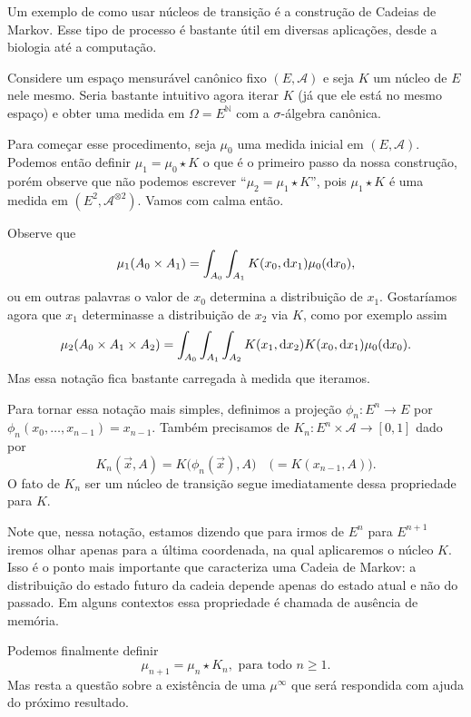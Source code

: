 Um exemplo de como usar núcleos de transição é a construção de Cadeias de Markov.
Esse tipo de processo é bastante útil em diversas aplicações, desde a biologia até a computação.

Considere um espaço mensurável canônico fixo $(E, \mathcal{A})$ e seja $K$ um núcleo de $E$ nele mesmo.
Seria bastante intuitivo agora iterar $K$ (já que ele está no mesmo espaço)
e obter uma medida em $\Omega =E^{\mathbb{N}}$ com a $\sigma$-álgebra canônica.

Para começar esse procedimento, seja $\mu_0$ uma medida inicial em $(E, \mathcal{A})$.
Podemos então definir $\mu_1 = \mu_0 \star K$ o que é o primeiro passo da nossa construção, porém observe que não podemos escrever ``$\mu_2 = \mu_1 \star K$'', pois $\mu_1 \star K$ é uma medida em $(E^2, \mathcal{A}^{\otimes 2})$.
Vamos com calma então.

Observe que
\begin{equation}
  \mu_1(A_0 \times A_1) = \int_{A_0} \int_{A_1} K(x_0, \mathop{}\!\mathrm{d} x_1) \mu_0(\mathop{}\!\mathrm{d} x_0),
\end{equation}
ou em outras palavras o valor de $x_0$ determina a distribuição de $x_1$.
Gostaríamos agora que $x_1$ determinasse a distribuição de $x_2$ via $K$, como por exemplo assim
\begin{equation}
  \mu_2(A_0 \times A_1 \times A_2) = \int_{A_0} \int_{A_1} \int_{A_2} K(x_1, \mathop{}\!\mathrm{d} x_2) K(x_0, \mathop{}\!\mathrm{d} x_1) \mu_0 (\mathop{}\!\mathrm{d} x_0).
\end{equation}
Mas essa notação fica bastante carregada à medida que iteramos.

Para tornar essa notação mais simples, definimos a projeção $\phi_n:E^n \to E$ por $\phi_n(x_0, \dots, x_{n-1}) = x_{n-1}$.
Também precisamos de $K_n: E^n \times \mathcal{A} \to [0,1]$ dado por
\begin{equation}
  K_n(\vec{x},A) = K\big(\phi_n(\vec{x}), A\big) \quad \big(= K(x_{n-1},A) \big).
\end{equation}
O fato de $K_n$ ser um núcleo de transição segue imediatamente dessa propriedade para $K$.

Note que, nessa notação, estamos dizendo que para irmos de $E^n$ para $E^{n+1}$ iremos olhar apenas para a última coordenada, na qual aplicaremos o núcleo $K$.
Isso é o ponto mais importante que caracteriza uma Cadeia de Markov: a distribuição do estado futuro da cadeia depende apenas do estado atual e não do passado.
Em alguns contextos essa propriedade é chamada de ausência de memória.

Podemos finalmente definir
\begin{equation}
  \label{e:Pn_Markov}
  \mu_{n+1} = \mu_n \star K_n, \text{ para todo $n \geq 1$}.
\end{equation}
Mas resta a questão sobre a existência de uma $\mu^\infty$ que será respondida com ajuda do próximo resultado.

